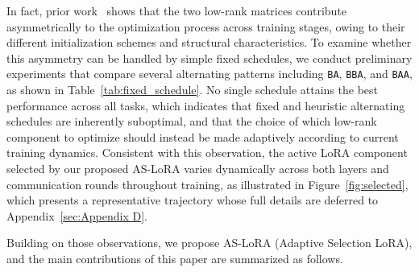 In fact, prior work~\cite{hayou2024lora+} shows that the two low-rank matrices contribute asymmetrically to the optimization process across training stages, owing to their different initialization schemes and structural characteristics. To examine whether this asymmetry can be handled by simple fixed schedules, we conduct preliminary experiments that compare several alternating patterns including \texttt{BA}, \texttt{BBA}, and \texttt{BAA}, as shown in Table~\ref{tab:fixed_schedule}. No single schedule attains the best performance across all tasks, which indicates that fixed and heuristic alternating schedules are inherently suboptimal, and that the choice of which low-rank component to optimize should instead be made adaptively according to current training dynamics. Consistent with this observation, the active LoRA component selected by our proposed AS-LoRA varies dynamically across both layers and communication rounds throughout training, as illustrated in Figure~\ref{fig:selected}, which presents a representative trajectory whose full details are deferred to Appendix~\ref{sec:Appendix D}.

Building on those observations, we propose AS-LoRA (Adaptive Selection LoRA), and the main contributions of this paper are summarized as follows.


